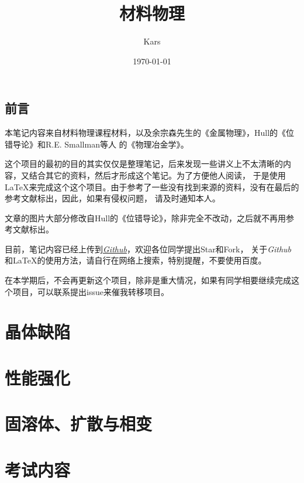 \documentclass[12pt]{book}
\title{材料物理}
\author{Kars}
\date{\today}
\numberwithin{equation}{section}
\begin{document}
\maketitle



\tableofcontents
{}

\clearpage
\chapter*{前言}
	本笔记内容来自材料物理课程材料，以及余宗森先生的《金属物理》\cite{余宗森1982高等学校教学用书}，Hull的《位错导论》\cite{HULL201143}和R.E. Smallman等人
	的《物理冶金学》\cite{ngan2007physical}。

	这个项目的最初的目的其实仅仅是整理笔记，后来发现一些讲义上不太清晰的内容，又结合其它的资料，然后才形成这个笔记。为了方便他人阅读，
	于是使用\LaTeX 来完成这个这个项目。由于参考了一些没有找到来源的资料，没有在最后的参考文献标出，因此，如果有侵权问题，
	请及时通知本人。

	文章的图片大部分修改自Hull的《位错导论》\cite{HULL2011137}，除非完全不改动，之后就不再用参考文献标出。

	目前，笔记内容已经上传到\href{https://github.com/lkmpoijn/Material_Physics}{\emph{Github}}，欢迎各位同学提出Star和Fork，
	关于\emph{Github}和\LaTeX 的使用方法，请自行在网络上搜索，特别提醒，不要使用百度。

	在本学期后，不会再更新这个项目，除非是重大情况，如果有同学相要继续完成这个项目，可以联系提出issue来催我转移项目。
\part{晶体缺陷}
	
	
	
\part{性能强化}
	
	
	
\part{固溶体、扩散与相变}
	
	
	
\part{考试内容}
	
\clearpage
\printindex
{}


\end{document}
